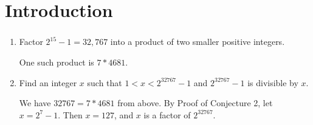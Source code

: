\documentclass[../main.tex]{subfiles}
\begin{document}
\ifmainfile
\else
    \makeatletter
    \begin{flushright}
        \@title \\
        \@author \\
        \@date
    \end{flushright}
    \nopagebreak
\fi

\begingroup
\let\clearpage\relax
\chapter*{Introduction}
\endgroup

\subsection{}

\begin{enumerate}
    \item
    \begin{q}
        Factor $2^{15} - 1 = 32,767$ into a product of two smaller positive integers.
    \end{q}

    \begin{ans}
        One such product is $7 * 4681$.
    \end{ans}
    \item
    \begin{q}
        Find an integer $x$ such that $1 < x <2^{32767} - 1$ and $2^{32767} - 1$ is divisible by $x$.
    \end{q}
    
    \begin{ans}
        We have $32767 = 7 * 4681$ from above. By Proof of Conjecture 2, let $x=2^{7}-1$. Then $x=127$, and $x$ is a factor of $2^{32767}$.
    \end{ans}
        
\end{enumerate}
\end{document}
